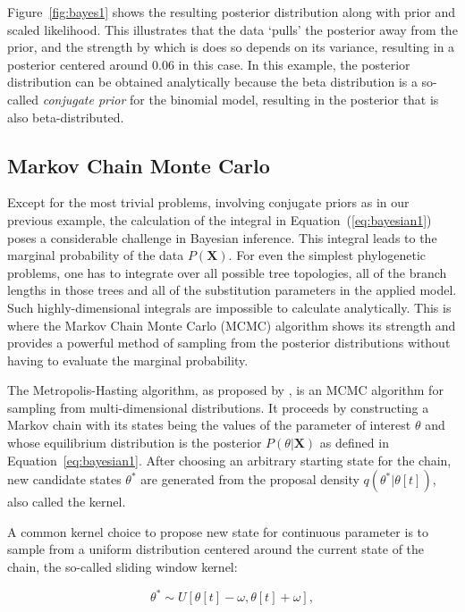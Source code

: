 Figure~\ref{fig:bayes1} shows the resulting posterior distribution along with prior and scaled likelihood.
This illustrates that the data `pulls' the posterior away from the prior, and the strength by which is does so depends on its variance, resulting in a posterior centered around 0.06 in this case.
In this example, the posterior distribution can be obtained analytically because the beta distribution is a so-called \emph{conjugate prior} for the binomial model, resulting in the posterior that is also beta-distributed.

\subsection{Markov Chain Monte Carlo\label{sub:mcmc} }

Except for the most trivial problems, involving conjugate priors as in our previous example, the calculation of the integral in Equation~(\ref{eq:bayesian1}) poses a considerable challenge in Bayesian inference.
This integral leads to the marginal probability of the data $P\left(\mathbf{X}\right)$. 
For even the simplest phylogenetic problems, one has to integrate over all possible tree topologies, all of the branch lengths in those trees and all of the substitution parameters in the applied model.
Such highly-dimensional integrals are impossible to calculate analytically.
This is where the Markov Chain Monte Carlo (MCMC) algorithm shows its strength and provides a powerful method of sampling from the posterior distributions without having to evaluate the marginal probability. %

The Metropolis-Hasting algorithm, as proposed by \citet{Metropolis1953}, is an MCMC algorithm for sampling from multi-dimensional distributions.
It proceeds by constructing a Markov chain with its states being the values of the parameter of interest $\theta$ and whose equilibrium distribution is the posterior $P\left(\theta|\mathbf{X}\right)$ as defined in Equation~\ref{eq:bayesian1}.
After choosing an arbitrary starting state for the chain, new candidate states $\theta^{*}$ are generated from the proposal density $q(\theta^{*} | \theta[t])$, also called the kernel.

A common kernel choice to propose new state for continuous parameter is to sample from a uniform distribution centered around the current state of the chain, the so-called sliding window kernel: 

$$\theta^{*}\sim U\left[\theta[t]-\omega,\theta[t]+\omega\right],$$

